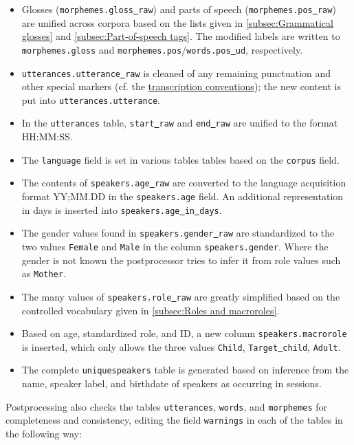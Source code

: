\documentclass[a4paper, 11pt]{book}
\newcommand{\und}{\underline{{ }}\hspace{0.2mm}}	%
\begin{document}
\begin{itemize}
	\item Glosses (\texttt{morphemes.gloss\und raw}) and parts of speech (\texttt{morphemes.pos\und raw}) are unified across corpora based on the lists given in \autoref{subsec:Grammatical glosses} and \autoref{subsec:Part-of-speech tags}. 
		The modified labels are written to \texttt{morphemes.gloss} and \texttt{morphemes.pos}/\texttt{words.pos\und ud}, respectively. 
	\item \texttt{utterances.utterance\und raw} is cleaned of any remaining punctuation and other special markers (cf. the \hyperref[subsec:Transcription conventions]{transcription conventions}); the new content is put into \texttt{utterances.utterance}.
	\item In the \texttt{utterances} table, \texttt{start\und raw} and \texttt{end\und raw} are unified to the format HH:MM:SS. 
	\item The \texttt{language} field is set in various tables tables based on the \texttt{corpus} field.
	\item The contents of \texttt{speakers.age\und raw} are converted to the language acquisition format YY;MM.DD in the \texttt{speakers.age} field.
		An additional representation in days is inserted into \texttt{speakers.age\und in\und days}. 	
	\item The gender values found in \texttt{speakers.gender\und raw} are standardized to the two values \texttt{Female} and \texttt{Male}
		in the column \texttt{speakers.gender}. Where the gender is not known the postprocessor tries to infer it from role values such as \texttt{Mother}. 
	\item The many values of \texttt{speakers.role\und raw} are greatly simplified based on the controlled vocabulary given in \autoref{subsec:Roles and macroroles}. 
	\item Based on age, standardized role, and ID, a new column \texttt{speakers.macrorole} is inserted, which only allows the three values
		\texttt{Child}, \texttt{Target\und child}, \texttt{Adult}. 
	\item The complete \texttt{uniquespeakers} table is generated based on inference from the name, speaker label, and birthdate of speakers as occurring in sessions. 
\end{itemize}

Postprocessing also checks the tables \texttt{utterances}, \texttt{words}, and \texttt{morphemes} for completeness and consistency, editing the field \texttt{warnings} in each of the tables in the following way: \\
\end{document}
